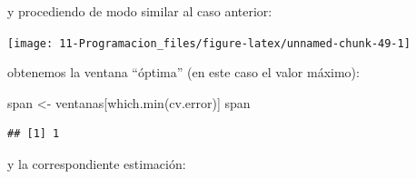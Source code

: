 \documentclass[
]{book}
\newenvironment{Shaded}{\begin{snugshade}}{\end{snugshade}}
\newcommand{\AttributeTok}[1]{\textcolor[rgb]{0.77,0.63,0.00}{#1}}
\newcommand{\CommentTok}[1]{\textcolor[rgb]{0.56,0.35,0.01}{\textit{#1}}}
\newcommand{\ControlFlowTok}[1]{\textcolor[rgb]{0.13,0.29,0.53}{\textbf{#1}}}
\newcommand{\DecValTok}[1]{\textcolor[rgb]{0.00,0.00,0.81}{#1}}
\newcommand{\FloatTok}[1]{\textcolor[rgb]{0.00,0.00,0.81}{#1}}
\newcommand{\FunctionTok}[1]{\textcolor[rgb]{0.00,0.00,0.00}{#1}}
\newcommand{\NormalTok}[1]{#1}
\newcommand{\OtherTok}[1]{\textcolor[rgb]{0.56,0.35,0.01}{#1}}
\newcommand{\SpecialCharTok}[1]{\textcolor[rgb]{0.00,0.00,0.00}{#1}}
\theoremstyle{break}
\theoremstyle{nonumberplain}
\begin{document}
y procediendo de modo similar al caso anterior:

\begin{Shaded}
\end{Shaded}

\begin{center}\texttt{[image: 11-Programacion\_files/figure-latex/unnamed-chunk-49-1]} \end{center}

obtenemos la ventana ``óptima'' (en este caso el valor máximo):

\begin{Shaded}
\begin{Highlighting}[]
\NormalTok{span }\OtherTok{\textless{}{-}}\NormalTok{ ventanas[}\FunctionTok{which.min}\NormalTok{(cv.error)]}
\NormalTok{span}
\end{Highlighting}
\end{Shaded}

\begin{verbatim}
## [1] 1
\end{verbatim}

y la correspondiente estimación:
\end{document}

